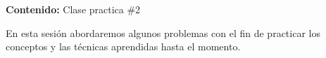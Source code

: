 {\Large\textbf{Contenido:} Clase practica \#2}

En esta sesión abordaremos algunos problemas con el fin de practicar los conceptos y las técnicas aprendidas hasta el momento.